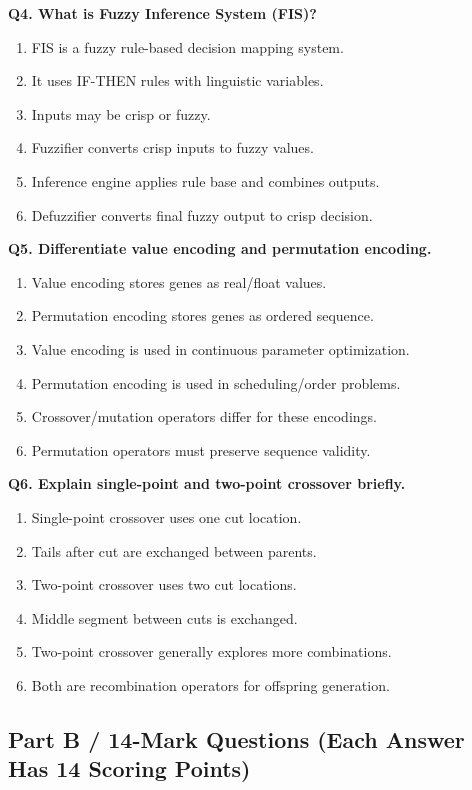 \documentclass[11pt,a4paper]{article}
\begin{document}
\textbf{Q4. What is Fuzzy Inference System (FIS)?}
\begin{enumerate}
\item FIS is a fuzzy rule-based decision mapping system.
\item It uses IF-THEN rules with linguistic variables.
\item Inputs may be crisp or fuzzy.
\item Fuzzifier converts crisp inputs to fuzzy values.
\item Inference engine applies rule base and combines outputs.
\item Defuzzifier converts final fuzzy output to crisp decision.
\end{enumerate}

\textbf{Q5. Differentiate value encoding and permutation encoding.}
\begin{enumerate}
\item Value encoding stores genes as real/float values.
\item Permutation encoding stores genes as ordered sequence.
\item Value encoding is used in continuous parameter optimization.
\item Permutation encoding is used in scheduling/order problems.
\item Crossover/mutation operators differ for these encodings.
\item Permutation operators must preserve sequence validity.
\end{enumerate}

\textbf{Q6. Explain single-point and two-point crossover briefly.}
\begin{enumerate}
\item Single-point crossover uses one cut location.
\item Tails after cut are exchanged between parents.
\item Two-point crossover uses two cut locations.
\item Middle segment between cuts is exchanged.
\item Two-point crossover generally explores more combinations.
\item Both are recombination operators for offspring generation.
\end{enumerate}

\subsection*{Part B / 14-Mark Questions (Each Answer Has 14 Scoring Points)}
\end{document}
